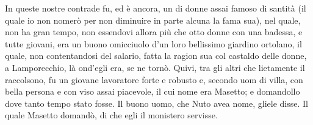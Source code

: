 \documentclass{article}
\begin{document}
\beginnumbering
\pstart
In queste nostre contrade fu, ed è ancora, un  di donne assai famoso di santità
(il quale io non nomerò per non diminuire in parte alcuna la fama sua), nel quale, non ha gran
tempo, non essendovi allora più che otto donne con una badessa, e tutte giovani, era un buono
omicciuolo d'un loro bellissimo giardino ortolano, il quale, non contentandosi del salario, fatta la
ragion sua col castaldo delle donne, a Lamporecchio, là ond'egli era, se ne tornò. Quivi, tra gli
altri che lietamente il raccolsono, fu un giovane lavoratore forte e robusto e, secondo uom di villa,
con bella persona e con viso assai piacevole, il cui nome era Masetto; e
domandollo dove tanto tempo stato fosse. Il buono uomo, che Nuto avea nome,
gliele disse. Il quale Masetto domandò, di che egli il monistero servisse. 
\pend
\endnumbering
\printglossaries
\end{document}

